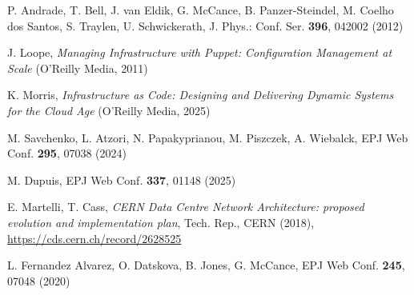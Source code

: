 \begin{thebibliography}{}

P. Andrade, T. Bell, J. van Eldik, G. McCance, B. Panzer-Steindel, M. Coelho dos Santos, S. Traylen, U. Schwickerath, J. Phys.: Conf. Ser. \textbf{396}, 042002 (2012)

J. Loope, \textit{Managing Infrastructure with Puppet: Configuration Management at Scale} (O'Reilly Media, 2011)

K. Morris, \textit{Infrastructure as Code: Designing and Delivering Dynamic Systems for the Cloud Age} (O'Reilly Media, 2025)

M. Savchenko, L. Atzori, N. Papakyprianou, M. Piszczek, A. Wiebalck, EPJ Web Conf. \textbf{295}, 07038 (2024)

M. Dupuis, EPJ Web Conf. \textbf{337}, 01148 (2025)

E. Martelli, T. Cass, \textit{CERN Data Centre Network Architecture: proposed evolution and implementation plan}, Tech. Rep., CERN (2018), \url{https://cds.cern.ch/record/2628525}

L. Fernandez Alvarez, O. Datskova, B. Jones, G. McCance, EPJ Web Conf. \textbf{245}, 07048 (2020)

\end{thebibliography}
